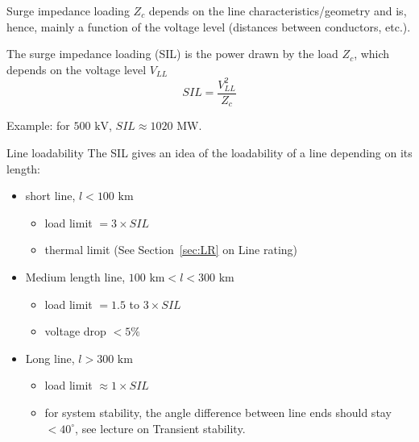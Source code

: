 \begin{frame}{Surge impedance loading}
    $Z_c$ depends on the line characteristics/geometry and is, hence, mainly a function of the voltage level (distances between conductors, etc.).

    The surge impedance loading (SIL) is the power drawn by the load $Z_c$, which depends on the voltage level $V_{LL}$
    $$
    SIL = \frac{V^2_{LL}}{Z_c}
    $$


    Example: for $500 \text{ kV}$, $SIL \approx 1020 \text{ MW}.$
\end{frame}

\begin{frame}{Line loadability}
    The SIL gives an idea of the loadability of a line depending on its length:
    \begin{itemize}
        \item short line, $ l < 100 \text{ km}$
        \begin{itemize}
            \item load limit $= 3 \times SIL$
            \item thermal limit (See Section~\ref{sec:LR} on Line rating)
        \end{itemize}
        \item Medium length line, $ 100 \text{ km} < l < 300 \text{ km}$
        \begin{itemize}
            \item load limit $= 1.5$ to $3 \times SIL$
            \item voltage drop $< 5\%$
        \end{itemize}
        \item Long line, $ l > 300 \text{ km}$
        \begin{itemize}
            \item load limit $\approx 1 \times SIL$
            \item for system stability, the angle difference between line ends should stay $< 40^\circ$, see lecture on Transient stability.
        \end{itemize}
    \end{itemize}
\end{frame}


